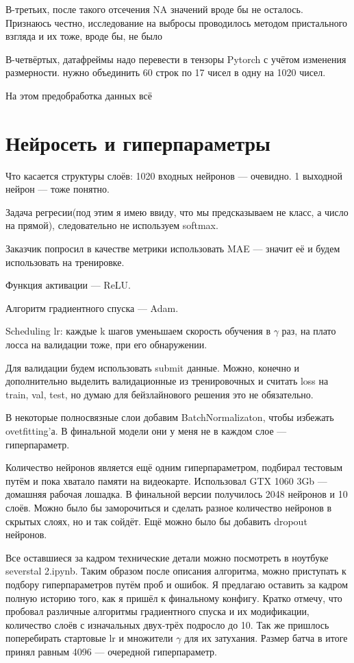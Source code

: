 \documentclass[12pt,a4paper]{report}
\begin{document}
В-третьих, после такого отсечения NA значений вроде бы не осталось. Признаюсь честно, исследование на выбросы проводилось методом пристального взгляда и их тоже, вроде бы, не было

В-четвёртых, датафреймы надо перевести в тензоры Pytorch с учётом изменения размерности. нужно объединить 60 строк по 17 чисел в одну на 1020 чисел.

На этом предобработка данных всё
\section*{Нейросеть и гиперпараметры}
Что касается структуры слоёв: 1020 входных нейронов — очевидно. 1 выходной нейрон — тоже понятно. 

Задача регресии(под этим я имею ввиду, что мы предсказываем не класс, а число на прямой), следовательно не используем softmax.

Заказчик попросил в качестве метрики использовать MAE — значит её и будем использовать на тренировке.

Функция активации — ReLU.

Алгоритм градиентного спуска — Adam.

Scheduling lr: каждые k шагов уменьшаем скорость обучения в $\gamma$ раз, на плато лосса на валидации тоже, при его обнаружении.

Для валидации будем использовать submit данные. Можно, конечно и дополнительно выделить валидационные из тренировочных и считать loss на train, val, test, но думаю для бейзлайнового решения это не обязательно.

В некоторые полносвязные слои добавим BatchNormalizaton, чтобы избежать ovetfitting'а. В финальной модели они у меня не в каждом слое —  гиперпараметр.

Количество нейронов является ещё одним гиперпараметром, подбирал тестовым путём и пока хватало памяти на видеокарте. Использовал GTX 1060 3Gb — домашняя рабочая лошадка. В финальной версии получилось 2048 нейронов и 10 слоёв. Можно было бы заморочиться и сделать разное количество нейронов в скрытых слоях, но и так сойдёт.
Ещё можно было бы добавить dropout нейронов.

Все оставшиеся за кадром технические детали можно посмотреть в ноутбуке severstal 2.ipynb.
Таким образом после описания алгоритма, можно приступать к подбору гиперпараметров путём проб и ошибок. Я предлагаю оставить за кадром полную историю того, как я пришёл к финальному конфигу. Кратко отмечу, что пробовал различные алгоритмы градиентного спуска и их модификации, количество слоёв с изначальных двух-трёх подросло до 10. Так же пришлось поперебирать стартовые lr и множители $\gamma$ для их затухания. Размер батча в итоге принял равным 4096 — очередной гиперпараметр.
\end{document}
